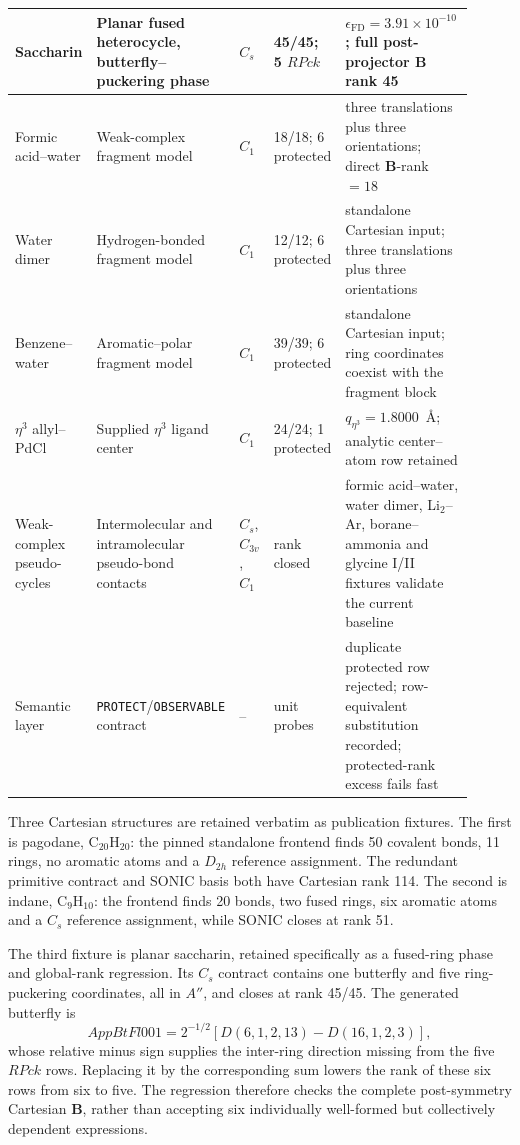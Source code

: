 \documentclass[10pt]{article}
\newcommand{\Bmat}{\mathbf{B}}
\begin{document}
\begin{longtable}{@{}p{0.14\linewidth}p{0.24\linewidth}p{0.07\linewidth}p{0.15\linewidth}p{0.31\linewidth}@{}}
\midrule
Saccharin & Planar fused heterocycle, butterfly--puckering phase & \(C_s\) & 45/45; 5 \(RPck\) & \(\epsilon_\mathrm{FD}=3.91\times10^{-10}\); full post-projector \(\Bmat\) rank 45 \\
\midrule
Formic acid--water & Weak-complex fragment model & \(C_1\) & 18/18; 6 protected & three translations plus three orientations; direct \(\Bmat\)-rank \(=18\) \\
\midrule
Water dimer & Hydrogen-bonded fragment model & \(C_1\) & 12/12; 6 protected & standalone Cartesian input; three translations plus three orientations \\
\midrule
Benzene--water & Aromatic--polar fragment model & \(C_1\) & 39/39; 6 protected & standalone Cartesian input; ring coordinates coexist with the fragment block \\
\midrule
\(\eta^3\) allyl--PdCl & Supplied \(\eta^3\) ligand center & \(C_1\) & 24/24; 1 protected & \(q_{\eta^3}=1.8000\)~\AA; analytic center--atom row retained \\
\midrule
Weak-complex pseudo-cycles & Intermolecular and intramolecular pseudo-bond contacts & \(C_s\), \(C_{3v}\), \(C_1\) & rank closed & formic acid--water, water dimer, Li\(_2\)--Ar, borane--ammonia and glycine I/II fixtures validate the current baseline \\
\midrule
Semantic layer & \texttt{PROTECT}/\texttt{OBSERVABLE} contract & -- & unit probes & duplicate protected row rejected; row-equivalent substitution recorded; protected-rank excess fails fast \\
\bottomrule
\end{longtable}

Three Cartesian structures are retained verbatim as publication fixtures.  The
first is pagodane, \(\mathrm{C}_{20}\mathrm{H}_{20}\): the pinned standalone
frontend finds 50 covalent bonds, 11 rings, no aromatic atoms and a
\(D_{2h}\) reference assignment.  The redundant primitive contract and SONIC
basis both have Cartesian rank 114.  The second is indane,
\(\mathrm{C}_{9}\mathrm{H}_{10}\): the frontend finds 20 bonds, two fused
rings, six aromatic atoms and a \(C_s\) reference assignment, while SONIC closes
at rank 51.

The third fixture is planar saccharin, retained specifically as a fused-ring
phase and global-rank regression.  Its \(C_s\) contract contains one butterfly
and five ring-puckering coordinates, all in \(A''\), and closes at rank 45/45.
The generated butterfly is
\begin{equation}
 AppBtFl001=2^{-1/2}\!\left[D(6,1,2,13)-D(16,1,2,3)\right],
\end{equation}
whose relative minus sign supplies the inter-ring direction missing from the
five \(RPck\) rows.  Replacing it by the corresponding sum lowers the rank of
these six rows from six to five.  The regression therefore checks the complete
post-symmetry Cartesian \(\Bmat\), rather than accepting six individually
well-formed but collectively dependent expressions.
\end{document}
